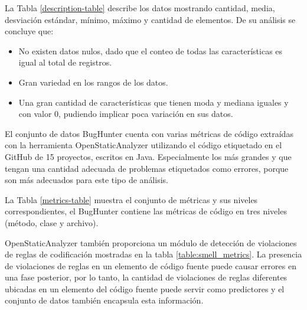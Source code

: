  

 La Tabla \ref{description-table} describe los datos mostrando cantidad, media, desviación estándar, mínimo, máximo y cantidad de elementos. De su análisis se concluye que:
 {
\fontsize{14pt}{14pt}\selectfont
\begin{itemize}
\item No existen datos nulos, dado que el conteo de todas las características es igual al total de registros.
\item Gran variedad en los rangos de los datos.
\item Una gran cantidad de características que tienen moda y mediana iguales y con valor 0, pudiendo implicar poca variación en sus datos.
\end{itemize}
}

El conjunto de datos BugHunter cuenta con varias métricas de código extraídas con la herramienta OpenStaticAnalyzer \cite{openstaticanalyzergithubio} utilizando el código etiquetado en el GitHub de 15 proyectos, escritos en Java. Especialmente los más grandes y que tengan una cantidad adecuada de problemas etiquetados como errores, porque son más adecuados para este tipo de análisis.



La Tabla \ref{metrics-table} muestra el conjunto de métricas y sus niveles correspondientes, el BugHunter contiene las métricas de código en tres niveles (método, clase y archivo).



OpenStaticAnalyzer también proporciona un módulo de detección de violaciones de reglas de codificación mostradas en la tabla \ref{table:smell_metrics}. La presencia de violaciones de reglas en un elemento de código fuente puede causar errores en una fase posterior, por lo tanto, la cantidad de violaciones de reglas diferentes ubicadas en un elemento del código fuente puede servir como predictores y el conjunto de datos también encapsula esta información. 


